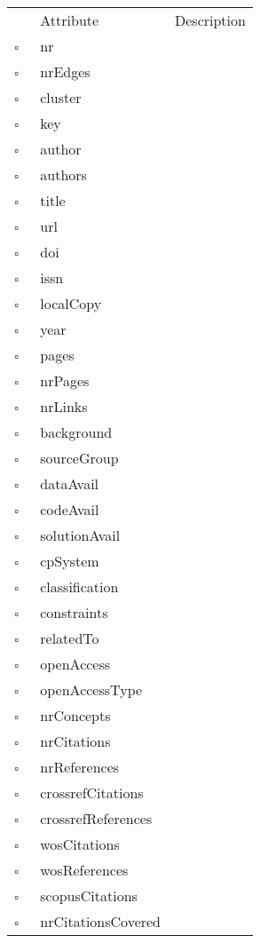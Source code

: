 \begin{table}
\caption{Work  }

\begin{longtable}{llp{8cm}}
& Attribute & Description \\
$\square$\ & nr &  \\
$\square$\ & nrEdges &  \\
$\square$\ & cluster &  \\
$\square$\ & key &  \\
$\square$\ & author &  \\
$\square$\ & authors &  \\
$\square$\ & title &  \\
$\square$\ & url &  \\
$\square$\ & doi &  \\
$\square$\ & issn &  \\
$\square$\ & localCopy &  \\
$\square$\ & year &  \\
$\square$\ & pages &  \\
$\square$\ & nrPages &  \\
$\square$\ & nrLinks &  \\
$\square$\ & background &  \\
$\square$\ & sourceGroup &  \\
$\square$\ & dataAvail &  \\
$\square$\ & codeAvail &  \\
$\square$\ & solutionAvail &  \\
$\square$\ & cpSystem &  \\
$\square$\ & classification &  \\
$\square$\ & constraints &  \\
$\square$\ & relatedTo &  \\
$\square$\ & openAccess &  \\
$\square$\ & openAccessType &  \\
$\square$\ & nrConcepts &  \\
$\square$\ & nrCitations &  \\
$\square$\ & nrReferences &  \\
$\square$\ & crossrefCitations &  \\
$\square$\ & crossrefReferences &  \\
$\square$\ & wosCitations &  \\
$\square$\ & wosReferences &  \\
$\square$\ & scopusCitations &  \\
$\square$\ & nrCitationsCovered &  \\

\end{longtable}
\end{table}
